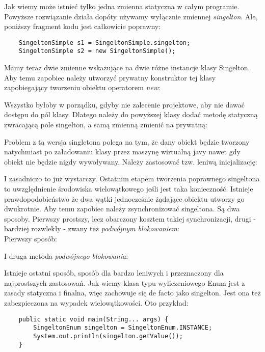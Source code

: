 \documentclass[12pt,a4paper]{article}
\begin{document}
	Jak wiemy może istnieć tylko jedna zmienna statyczna w całym programie. Powyższe rozwiązanie działa dopóty używamy wyłącznie zmiennej \textit{singelton}. Ale, poniższy fragment kodu jest całkowicie poprawny:
	\begin{lstlisting}
	SingeltonSimple s1 = SingeltonSimple.singelton;
	SingeltonSimple s2 = new SingeltonSimple();
	\end{lstlisting}
	Mamy teraz dwie zmienne wskazujące na dwie różne instancje klasy Singelton. Aby temu zapobiec należy utworzyć prywatny konstruktor tej klasy zapobiegający tworzeniu obiektu operatorem \textit{new}:
	
	Wszystko byłoby w porządku, gdyby nie zalecenie projektowe, aby nie dawać dostępu do pól klasy. Dlatego należy do powyższej klasy dodać metodę statyczną zwracającą pole singelton, a samą zmienną zmienić na prywatną:
	
	Problem z tą wersja singletona polega na tym, że dany obiekt będzie tworzony natychmiast po załadowaniu klasy przez maszynę wirtualną javy nawet gdy obiekt nie będzie nigdy wywoływany. Należy zastosować tzw. leniwą inicjalizację:
	
	I zasadniczo to już wystarczy. Ostatnim etapem tworzenia poprawnego singeltona to uwzględnienie środowiska wielowątkowego jeśli jest taka konieczność. Istnieje prawdopodobieństwo że dwa wątki jednocześnie żądające obiektu utworzy go dwukrotnie. Aby temu zapobiec należy zsynchronizować singeltona. Są dwa sposoby. Pierwszy prostszy, lecz obarczony kosztem takiej synchronizacji, drugi - bardziej rozwlekły - zwany też \textit{podwójnym blokowaniem}:\\
	Pierwszy sposób:
	
	I druga metoda \textit{podwójnego blokowania}:
	
	Istnieje ostatni sposób, sposób dla bardzo leniwych i przeznaczony dla najprostszych zastosowań. Jak wiemy klasa typu wyliczeniowego Enum jest z zasady statyczna i finalna, więc zachowuje się de facto jako singelton. Jest ona też zabezpieczona na wypadek wielowątkowości. Oto przykład:
	
	\begin{lstlisting}
	public static void main(String... args) {
		SingeltonEnum singelton = SingeltonEnum.INSTANCE;
		System.out.println(singelton.getValue());
	}
	\end{lstlisting}
\end{document}
